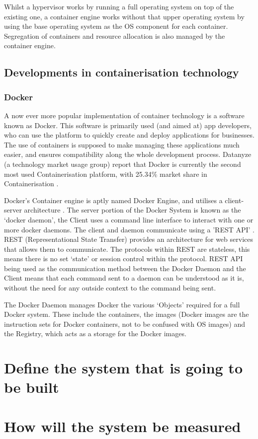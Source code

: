 Whilst a hypervisor works by running a full operating system on top of the existing one, a container engine works without that upper operating system by using the base operating system as the OS component for each container. Segregation of containers and resource allocation is also managed by the container engine.

\section{Developments in containerisation technology}

\subsection{Docker}
A now ever more popular implementation of container technology is a software known as Docker. This software is primarily used (and aimed at) app developers, who can use the platform to quickly create and deploy applications for businesses. The use of containers is supposed to make managing these applications much easier, and ensures compatibility along the whole development process.
Datanyze (a technology market usage group) report that Docker is currently the second most used Containerisation platform, with 25.34\% market share in Containerisation \citep{datanyze}. 

Docker's Container engine is aptly named Docker Engine, and utilises a client-server architecture \citep{DockerArchitecture}. The server portion of the Docker System is known as the `docker daemon', the Client uses a command line interface to interact with one or more docker daemons. The client and daemon communicate using a 'REST API' \citep{DockerArchitecture}. REST (Representational State Transfer) provides an architecture for web services \citep{W3Architecture2004} that allows them to communicate. The protocols within REST are stateless, this means there is no set `state' or session control within the protocol. REST API being used as the communication method between the Docker Daemon and the Client means that each command sent to a daemon can be understood as it is, without the need for any outside context to the command being sent.

The Docker Daemon manages Docker the various `Objects' \citep{DockerArchitecture} required for a full Docker system. These include the containers, the images (Docker images are the instruction sets for Docker containers, not to be confused with OS images) and the Registry, which acts as a storage for the Docker images.




\chapter{Define the system that is going to be built}



\chapter{How will the system be measured}
